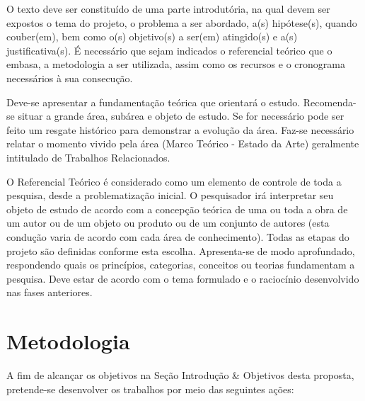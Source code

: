 \documentclass[
	12pt,				%
	openright,			%
	oneside,
	a4paper,			%
	english,			%
	french,				%
	spanish,			%
	brazil,				%
	]{abntex2}
\begin{document}
%
\begin{citacao}
O texto deve ser constituído de uma parte introdutória, na qual devem ser
expostos o tema do projeto, o problema a ser abordado, a(s) hipótese(s),
quando couber(em), bem como o(s) objetivo(s) a ser(em) atingido(s) e a(s)
justificativa(s). É necessário que sejam indicados o referencial teórico que
o embasa, a metodologia a ser utilizada, assim como os recursos e o cronograma
necessários à sua consecução.
\end{citacao}

Deve-se apresentar a fundamentação teórica que orientará o estudo. Recomenda-se situar a grande área, subárea e objeto de estudo. Se for necessário pode ser feito um resgate histórico para demonstrar a evolução da área. Faz-se necessário relatar o momento vivido pela área (Marco Teórico - Estado da Arte) geralmente intitulado de Trabalhos Relacionados.

O Referencial Teórico é considerado como um elemento de controle de toda a pesquisa, desde a problematização inicial. O pesquisador irá interpretar seu objeto de estudo de acordo com a concepção teórica de uma ou toda a obra de um autor ou de um objeto ou produto ou de um conjunto de autores (esta condução varia de acordo com cada área de conhecimento). Todas as etapas do projeto são definidas conforme esta escolha. Apresenta-se de modo aprofundado, respondendo quais os princípios, categorias, conceitos ou teorias fundamentam a pesquisa. Deve estar de acordo com o tema formulado e o raciocínio desenvolvido nas fases anteriores. 



\chapter{Metodologia}

 A fim de alcançar os objetivos na Seção Introdução \& Objetivos desta proposta, pretende-se desenvolver os trabalhos por meio das seguintes ações: 
\end{document}
